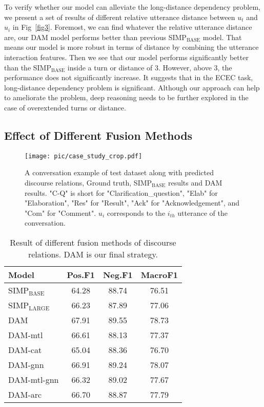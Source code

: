 \documentclass[11pt]{article}
\begin{document}
To verify whether our model can alleviate the long-distance dependency problem, we present a set of results of different relative utterance distance between $u_t$ and $u_i$ in Fig~\ref{fig3}.
Foremost, we can find whatever the relative utterance distance are, our DAM model performs better than previous SIMP$_{\textrm{BASE}}$ model.
That means our model is more robust in terms of distance by combining the utterance interaction features.
Then we see that our model performs significantly better than the SIMP$_{\textrm{BASE}}$ inside a turn or distance of 3.
However, above 3, the performance does not significantly increase.
It suggests that in the ECEC task, long-distance dependency problem is significant.
Although our approach can help to ameliorate the problem, deep reasoning needs to be further explored in the case of overextended turns or distance.

\subsection{Effect of Different Fusion Methods}
\begin{figure*}
    \centering
    \texttt{[image: pic/case\_study\_crop.pdf]}
    \caption{A conversation example of test dataset along with predicted discourse relations, Ground truth, SIMP$_\textrm{BASE}$ results and DAM results. 
    "C-Q" is short for "Clarification\_question", "Elab" for "Elaboration", "Res" for "Result", "Ack" for "Acknowledgement", and "Com" for "Comment". 
    $u_i$ corresponds to the $i_{th}$ utterance of the conversation.} 
    \label{fig4}
\end{figure*}

\begin{table}
\centering
\begin{tabular}{lccc}
\toprule
\textbf{Model} & \textbf{Pos.F1}    & \textbf{Neg.F1}   & \textbf{MacroF1}  \\
\midrule
SIMP$_{\textrm{BASE}}$  & 64.28     & 88.74    & 76.51     \\
SIMP$_{\textrm{LARGE}}$ & 66.23     & 87.89    & 77.06     \\
\midrule
DAM          & 67.91     & 89.55    & 78.73     \\
DAM-mtl      & 66.61     & 88.13    & 77.37     \\
DAM-cat      & 65.04     & 88.36    & 76.70     \\
DAM-gnn      & 66.91     & 89.24    & 78.07     \\
DAM-mtl-gnn  & 66.32     & 89.02    & 77.67     \\
DAM-arc      & 66.70     & 88.87    & 77.79     \\
\bottomrule
\end{tabular}
\caption{\label{tab5}Result of different fusion methods of discourse relations. DAM is our final strategy.}
\end{table}
\end{document}
